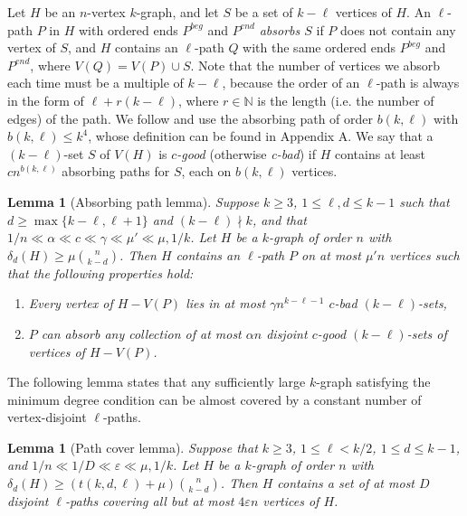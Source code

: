 \documentclass[11pt, reqno]{amsart}    	%
\newtheorem{lemma}[thm]{Lemma}
\theoremstyle{definition}
\numberwithin{equation}{section}
\begin{document}
	Let $H$ be an $n$-vertex $k$-graph, and let $S$ be a set of $ k-\ell $ vertices of $H$. 
	An $ \ell $-path $P$ in $H$ with ordered ends $ P^{beg} $ and $ P^{end} $ \emph{absorbs $S$} if $P$ does not contain any vertex of $S$, and $H$ contains an $ \ell $-path $Q$ with the same ordered ends $ P^{beg} $ and $ P^{end} $, where $V(Q)=V(P)\cup S $.
	Note that the number of vertices we absorb each time must be a multiple of $k-\ell$, because the order of an  $ \ell $-path is always in the form of $\ell+r(k-\ell)$, where $r\in \mathbb{N}$ is the length (i.e. the number of edges) of the path. 
	We follow \cite{Daniela2010Hamilton} and use the absorbing path of order $b(k,\ell)$ with $b(k,\ell)\le k^{4}$, whose definition can be found in  Appendix A.  
	We say that a $( k-\ell) $-set $S$ of $V(H)$ is \emph{$c$-good} (otherwise \emph{c-bad}) if $H$ contains at least $cn^{b(k,\ell)}$ absorbing paths for $S$, each on  $b(k,\ell)$ vertices.
	
	\begin{lemma} [Absorbing path lemma]
		\label{abs lem} 
		Suppose $k\ge3$, $1\leq \ell,d \leq k-1$ such that $d \ge \max\{k-\ell,\ell+1\}$ and $(k-\ell)\nmid k$, and that $1/n \ll \alpha \ll c \ll \gamma  \ll\mu'\ll \mu,1/k$. 
		Let $H$ be a $k$-graph of order $n$ with $\delta_d(H)\ge \mu \binom{n}{k-d}$. Then $H$ contains an $\ell$-path $P$ on at most $\mu' n$ vertices such that the following properties hold:
		\begin{enumerate}
			\item \label{AbsLem:1} Every vertex of $H - V(P)$ lies in at most  $\gamma n^{k-\ell-1}$ $c$-bad $(k-\ell)$-sets, 
			\item \label{AbsLem:2} $P$ can absorb any collection of at most $\alpha n$ disjoint $c$-good $(k-\ell)$-sets of vertices of $H-V (P)$.
		\end{enumerate}
	\end{lemma}
	
	The following lemma states that any sufficiently large $ k $-graph satisfying the minimum degree condition can be almost covered by a constant number of vertex-disjoint $ \ell $-paths.
	
	\begin{lemma} [Path cover lemma]
		\label{pat lem}
		Suppose that $k\ge3$,   $1\leq \ell<k/2$,  $1\leq d\leq k-1$, and  $1/n \ll 1/D\ll \varepsilon \ll\mu,1/k$. Let $H$ be a $k$-graph of order $n$ with $\delta_d(H)\ge (t(k,d,\ell)+\mu) \binom{n}{k-d}$.
		Then $H$ contains a set of at most $D$ disjoint $\ell$-paths covering all but at most $4\varepsilon n$ vertices of $H$.
	\end{lemma}
	
\end{document}
